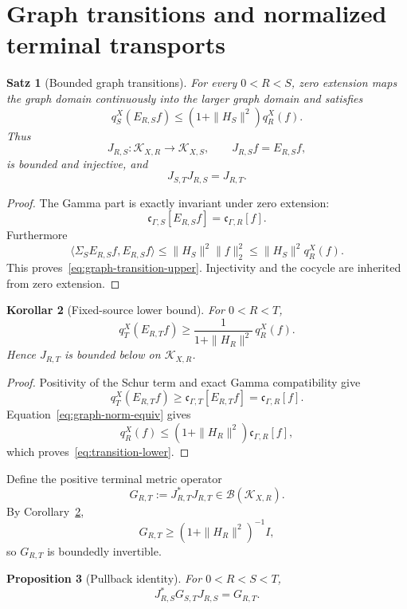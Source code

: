 \documentclass[11pt,a4paper]{amsart}
\newtheorem{theorem}{Satz}[section]
\newtheorem{proposition}[theorem]{Proposition}
\newtheorem{corollary}[theorem]{Korollar}
\newcommand{\KXR}[1]{\mathcal K_{X,#1}}
\begin{document}
\section{Graph transitions and normalized terminal transports}\label{sec:terminal}

\begin{theorem}[Bounded graph transitions]\label{thm:graph-transition}
For every $0<R<S$, zero extension maps the graph domain continuously into the larger
graph domain and satisfies
\[
 \boxed{
 q_S^X(E_{R,S}f)
 \le(1+\|H_S\|^2)q_R^X(f).
 }
\tag{4.1}\label{eq:graph-transition-upper}
\]
Thus
\[
 \boxed{
 J_{R,S}:\KXR{R}\longrightarrow\KXR{S},
 \qquad J_{R,S}f=E_{R,S}f,
 }
\tag{4.2}\label{eq:graph-transition}
\]
is bounded and injective, and
\[
 \boxed{J_{S,T}J_{R,S}=J_{R,T}.}
\tag{4.3}\label{eq:transition-cocycle}
\]
\end{theorem}

\begin{proof}
The Gamma part is exactly invariant under zero extension:
\[
 \mathfrak c_{\Gamma,S}[E_{R,S}f]
 =\mathfrak c_{\Gamma,R}[f].
\]
Furthermore
\[
 \langle\Sigma_SE_{R,S}f,E_{R,S}f\rangle
 \le\|H_S\|^2\|f\|_2^2
 \le\|H_S\|^2q_R^X(f).
\]
This proves~\eqref{eq:graph-transition-upper}.  Injectivity and the cocycle are inherited from zero extension.
\end{proof}

\begin{corollary}[Fixed-source lower bound]\label{cor:transition-lower}
For $0<R<T$,
\[
 \boxed{
 q_T^X(E_{R,T}f)
 \ge\frac{1}{1+\|H_R\|^2}\,q_R^X(f).
 }
\tag{4.4}\label{eq:transition-lower}
\]
Hence $J_{R,T}$ is bounded below on $\KXR{R}$.
\end{corollary}

\begin{proof}
Positivity of the Schur term and exact Gamma compatibility give
\[
 q_T^X(E_{R,T}f)
 \ge\mathfrak c_{\Gamma,T}[E_{R,T}f]
 =\mathfrak c_{\Gamma,R}[f].
\]
Equation~\eqref{eq:graph-norm-equiv} gives
\[
 q_R^X(f)\le(1+\|H_R\|^2)\mathfrak c_{\Gamma,R}[f],
\]
which proves~\eqref{eq:transition-lower}.
\end{proof}

Define the positive terminal metric operator
\[
 \boxed{G_{R,T}:=J_{R,T}^*J_{R,T}\in\mathcal B(\KXR{R}).}
\tag{4.5}\label{eq:terminal-metric}
\]
By Corollary~\ref{cor:transition-lower},
\[
 G_{R,T}\ge(1+\|H_R\|^2)^{-1}I,
\]
so $G_{R,T}$ is boundedly invertible.

\begin{proposition}[Pullback identity]\label{prop:pullback}
For $0<R<S<T$,
\[
 \boxed{J_{R,S}^*G_{S,T}J_{R,S}=G_{R,T}.}
\tag{4.6}\label{eq:metric-pullback}
\]
\end{proposition}
\end{document}
